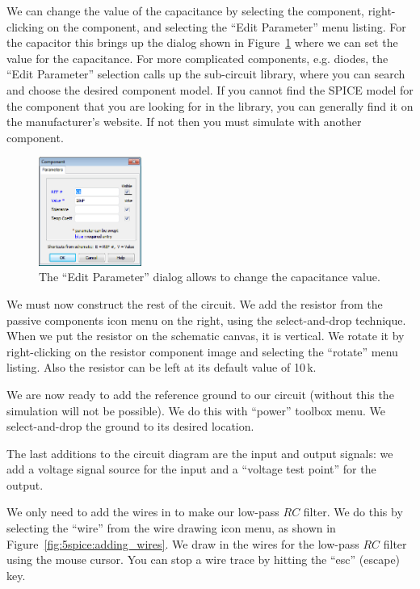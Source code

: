 \documentclass{article}
\begin{document}
We can change the value of the capacitance by selecting the component, right-clicking on the component, and selecting the ``Edit Parameter'' menu listing.  For the capacitor this brings up the dialog shown in Figure~\ref{fig:5spice:edit_parameter} where we can set the value for the capacitance.  For more complicated components, e.g. diodes, the ``Edit Parameter'' selection calls up the sub-circuit library, where you can search and choose the desired component model.  If you cannot find the SPICE model for the component that you are looking for in the library, you can generally find it on the manufacturer's website. If not then you must simulate with another component.

\begin{figure}
\begin{center}
\includegraphics[width=0.3\textwidth]{pics/5spice_edit_parameters}
\end{center}
\caption{The ``Edit Parameter'' dialog allows to change the capacitance value.}
\label{fig:5spice:edit_parameter}
\end{figure}

We must now construct the rest of the circuit.  We add the resistor from the passive components icon menu on the right, using the select-and-drop technique.  When we put the resistor on the schematic canvas, it is vertical.  We rotate it by right-clicking on the resistor component image and selecting the ``rotate'' menu listing.  Also the resistor can be left at its default value of 10\,k\Ohm.

We are now ready to add the reference ground to our circuit (without this the simulation will not be possible).  We do this with ``power'' toolbox menu.  We select-and-drop the ground to its desired location.

The last additions to the circuit diagram are the input and output signals: we add a voltage signal source for the input and a ``voltage test point'' for the output.

We only need to add the wires in to make our low-pass $RC$ filter.  We do this by selecting the ``wire'' from the wire drawing icon menu, as shown in Figure~\ref{fig:5spice:adding_wires}.  We draw in the wires for the low-pass $RC$ filter using the mouse cursor.  You can stop a wire trace by hitting the ``esc'' (escape) key.
\end{document}
